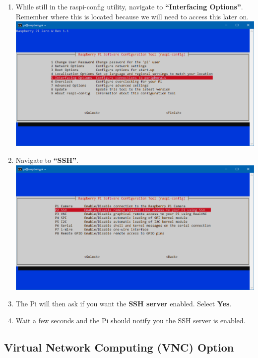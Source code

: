 \documentclass{article}
\begin{document}
\begin{enumerate}
  \item While still in the raspi-config utility, navigate to \textbf{``Interfacing Options''}. Remember where this is located because we will need to access this later on.
  \newline
  \newline
  \includegraphics[width=1.00\textwidth]{rcifoptions}
  \item Navigate to \textbf{``SSH''}.
  \newline
  \newline
  \includegraphics[width=1.00\textwidth]{rcssh}
  \item The Pi will then ask if you want the \textbf{SSH server} enabled. Select \textbf{Yes}.
  \item Wait a few seconds and the Pi should notify you the SSH server is enabled.
\end{enumerate}

\subsection{Virtual Network Computing (VNC) Option}
\end{document}
